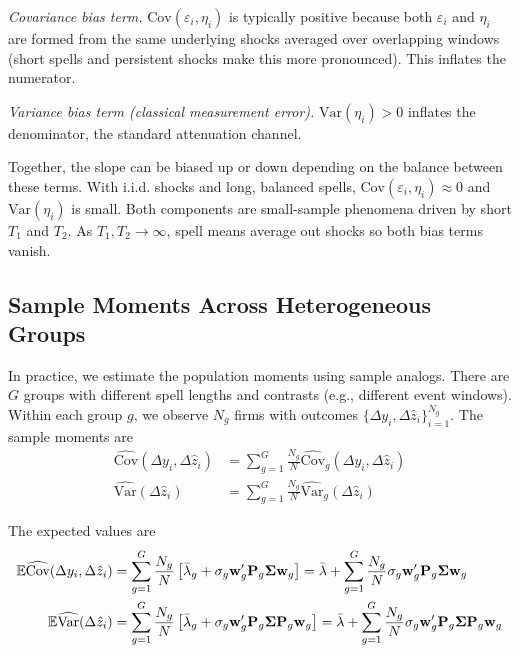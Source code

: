 \documentclass[11pt,a4paper]{article}
\newcommand{\Var}{\text{Var}}
\newcommand{\Cov}{\text{Cov}}
\begin{document}
\textit{Covariance bias term.} $\Cov(\varepsilon_i,\eta_i)$ is typically positive because both $\varepsilon_i$ and $\eta_i$ are formed from the same underlying shocks averaged over overlapping windows (short spells and persistent shocks make this more pronounced). This inflates the numerator.

\textit{Variance bias term (classical measurement error).} $\Var(\eta_i)>0$ inflates the denominator, the standard attenuation channel.

Together, the slope can be biased up or down depending on the balance between these terms. With i.i.d. shocks and long, balanced spells, $\Cov(\varepsilon_i,\eta_i)\approx 0$ and $\Var(\eta_i)$ is small. Both components are small-sample phenomena driven by short $T_1$ and $T_2$. As $T_1,T_2\to\infty$, spell means average out shocks so both bias terms vanish.

\subsection{Sample Moments Across Heterogeneous Groups}

In practice, we estimate the population moments using sample analogs. There are $G$ groups with different spell lengths and contrasts (e.g., different event windows). Within each group $g$, we observe $N_g$ firms with outcomes $\{\Delta y_i, \Delta \hat z_i\}_{i=1}^{N_g}$. The sample moments are
\begin{align}
\widehat{\Cov}(\Delta y_i,\Delta \hat z_i) &= \sum_{g=1}^G \frac{N_g}{N} \widehat{\Cov}_g(\Delta y_i,\Delta \hat z_i)\\
\widehat{\Var}(\Delta \hat z_i) &= \sum_{g=1}^G \frac{N_g}{N} \widehat{\Var}_g(\Delta \hat z_i)
\end{align}

The expected values are
\begin{align}
\mathbb E\widehat{\Cov}(\Delta y_i,\Delta \hat z_i) &= \sum_{g=1}^G \frac{N_g}{N} \left[ 
\Bar\lambda_g
+ \sigma_g \mathbf w_g' \mathbf P_g\mathbf\Sigma \mathbf w_g\right] = 
\Bar\lambda +\sum_{g=1}^G \frac{N_g}{N} \sigma_g \mathbf w_g' \mathbf P_g\mathbf\Sigma \mathbf w_g\\
\mathbb E\widehat{\Var}(\Delta \hat z_i) &= \sum_{g=1}^G \frac{N_g}{N} \left[ 
\Bar\lambda_g
+ \sigma_g \mathbf w_g' \mathbf P_g\mathbf\Sigma \mathbf P_g \mathbf w_g\right] = 
\Bar\lambda +\sum_{g=1}^G \frac{N_g}{N} \sigma_g \mathbf w_g' \mathbf P_g\mathbf\Sigma \mathbf P_g \mathbf w_g
\end{align}
\end{document}
